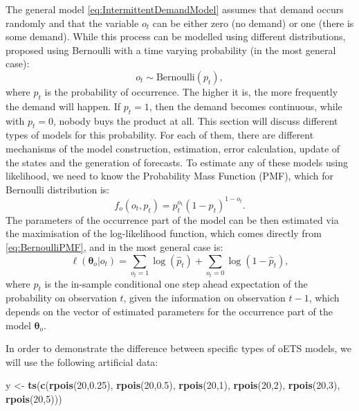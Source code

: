 \documentclass[]{book}
\newenvironment{Shaded}{\begin{snugshade}}{\end{snugshade}}
\newcommand{\DecValTok}[1]{\textcolor[rgb]{0.00,0.00,0.81}{#1}}
\newcommand{\FloatTok}[1]{\textcolor[rgb]{0.00,0.00,0.81}{#1}}
\newcommand{\KeywordTok}[1]{\textcolor[rgb]{0.13,0.29,0.53}{\textbf{#1}}}
\newcommand{\NormalTok}[1]{#1}
\newcommand{\StringTok}[1]{\textcolor[rgb]{0.31,0.60,0.02}{#1}}
\theoremstyle{definition}
\theoremstyle{definition}
\theoremstyle{definition}
\theoremstyle{definition}
\theoremstyle{remark}
\begin{document}
The general model \eqref{eq:IntermittentDemandModel} assumes that demand occurs randomly and that the variable \(o_t\) can be either zero (no demand) or one (there is some demand). While this process can be modelled using different distributions, \citet{Svetunkov2019a} proposed using Bernoulli with a time varying probability (in the most general case):
\begin{equation}
o_t \sim \text{Bernoulli} \left(p_t \right) ,
\label{eq:OccurrenceModelBernoulli}
\end{equation}
where \(p_t\) is the probability of occurrence. The higher it is, the more frequently the demand will happen. If \(p_t=1\), then the demand becomes continuous, while with \(p_t=0\), nobody buys the product at all. This section will discuss different types of models for this probability. For each of them, there are different mechanisms of the model construction, estimation, error calculation, update of the states and the generation of forecasts. To estimate any of these models using likelihood, we need to know the Probability Mass Function (PMF), which for Bernoulli distribution is:
\begin{equation}
f_o(o_t, p_t) = p_t^{o_t}(1-p_t)^{1-o_t}.
\label{eq:BernoulliPMF}
\end{equation}
The parameters of the occurrence part of the model can be then estimated via the maximisation of the log-likelihood function, which comes directly from \eqref{eq:BernoulliPMF}, and in the most general case is:
\begin{equation}
\ell \left(\boldsymbol{\theta}_o | o_t \right) = \sum_{o_t=1} \log(\hat{p}_t) + \sum_{o_t=0} \log(1-\hat{p}_t) ,
\label{eq:oETSLikelihood}
\end{equation}
where \(\hat{p}_t\) is the in-sample conditional one step ahead expectation of the probability on observation \(t\), given the information on observation \(t-1\), which depends on the vector of estimated parameters for the occurrence part of the model \(\boldsymbol{\theta}_o\).

In order to demonstrate the difference between specific types of oETS models, we will use the following artificial data:

\begin{Shaded}
\begin{Highlighting}[]
\NormalTok{y <-}\StringTok{ }\KeywordTok{ts}\NormalTok{(}\KeywordTok{c}\NormalTok{(}\KeywordTok{rpois}\NormalTok{(}\DecValTok{20}\NormalTok{,}\FloatTok{0.25}\NormalTok{), }\KeywordTok{rpois}\NormalTok{(}\DecValTok{20}\NormalTok{,}\FloatTok{0.5}\NormalTok{), }\KeywordTok{rpois}\NormalTok{(}\DecValTok{20}\NormalTok{,}\DecValTok{1}\NormalTok{),}
          \KeywordTok{rpois}\NormalTok{(}\DecValTok{20}\NormalTok{,}\DecValTok{2}\NormalTok{), }\KeywordTok{rpois}\NormalTok{(}\DecValTok{20}\NormalTok{,}\DecValTok{3}\NormalTok{), }\KeywordTok{rpois}\NormalTok{(}\DecValTok{20}\NormalTok{,}\DecValTok{5}\NormalTok{)))}
\end{Highlighting}
\end{Shaded}
\end{document}
